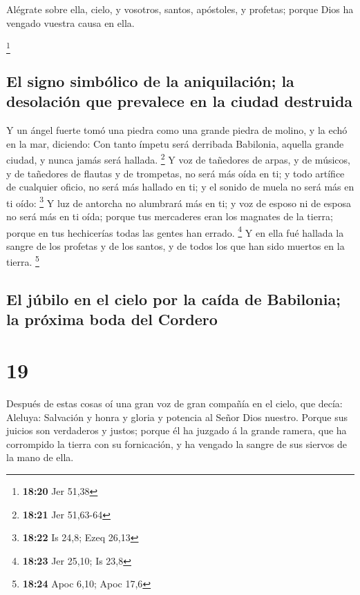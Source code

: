  Alégrate sobre ella, cielo, y vosotros, santos,
apóstoles, y profetas; porque Dios ha vengado vuestra causa en ella.

\footnote{\textbf{18:20} Jer 51,38}

\hypertarget{el-signo-simbuxf3lico-de-la-aniquilaciuxf3n-la-desolaciuxf3n-que-prevalece-en-la-ciudad-destruida}{%
\subsection{El signo simbólico de la aniquilación; la desolación que
prevalece en la ciudad
destruida}\label{el-signo-simbuxf3lico-de-la-aniquilaciuxf3n-la-desolaciuxf3n-que-prevalece-en-la-ciudad-destruida}}

 Y un ángel fuerte tomó una piedra como una grande piedra
de molino, y la echó en la mar, diciendo: Con tanto ímpetu será
derribada Babilonia, aquella grande ciudad, y nunca jamás será hallada.
\footnote{\textbf{18:21} Jer 51,63-64}  Y voz de
tañedores de arpas, y de músicos, y de tañedores de flautas y de
trompetas, no será más oída en ti; y todo artífice de cualquier oficio,
no será más hallado en ti; y el sonido de muela no será más en ti oído:
\footnote{\textbf{18:22} Is 24,8; Ezeq 26,13}  Y luz de
antorcha no alumbrará más en ti; y voz de esposo ni de esposa no será
más en ti oída; porque tus mercaderes eran los magnates de la tierra;
porque en tus hechicerías todas las gentes han errado. \footnote{\textbf{18:23}
  Jer 25,10; Is 23,8}  Y en ella fué hallada la sangre de
los profetas y de los santos, y de todos los que han sido muertos en la
tierra. \footnote{\textbf{18:24} Apoc 6,10; Apoc 17,6}

\hypertarget{el-juxfabilo-en-el-cielo-por-la-cauxedda-de-babilonia-la-pruxf3xima-boda-del-cordero}{%
\subsection{El júbilo en el cielo por la caída de Babilonia; la próxima
boda del
Cordero}\label{el-juxfabilo-en-el-cielo-por-la-cauxedda-de-babilonia-la-pruxf3xima-boda-del-cordero}}

\hypertarget{section-18}{%
\section{19}\label{section-18}}

 Después de estas cosas oí una gran voz de gran compañía
en el cielo, que decía: Aleluya: Salvación y honra y gloria y potencia
al Señor Dios nuestro.  Porque sus juicios son verdaderos
y justos; porque él ha juzgado á la grande ramera, que ha corrompido la
tierra con su fornicación, y ha vengado la sangre de sus siervos de la
mano de ella.


